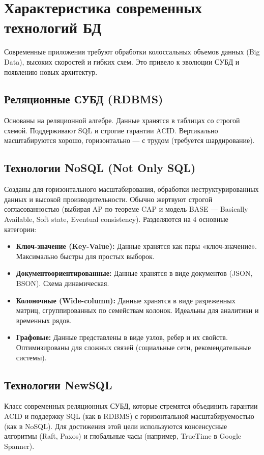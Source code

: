 \documentclass[12pt, a4paper]{article}
\begin{document}
\section{Характеристика современных технологий БД}

Современные приложения требуют обработки колоссальных объемов данных (Big Data), высоких скоростей и гибких схем. Это привело к эволюции СУБД и появлению новых архитектур.

\subsection{Реляционные СУБД (RDBMS)}
Основаны на реляционной алгебре. Данные хранятся в таблицах со строгой схемой. Поддерживают SQL и строгие гарантии ACID. Вертикально масштабируются хорошо, горизонтально — с трудом (требуется шардирование).

\subsection{Технологии NoSQL (Not Only SQL)}
Созданы для горизонтального масштабирования, обработки неструктурированных данных и высокой производительности. Обычно жертвуют строгой согласованностью (выбирая AP по теореме CAP и модель BASE — Basically Available, Soft state, Eventual consistency).
Разделяются на 4 основные категории:
\begin{itemize}
    \item \textbf{Ключ-значение (Key-Value):} Данные хранятся как пары «ключ-значение». Максимально быстры для простых выборок.
    \item \textbf{Документоориентированные:} Данные хранятся в виде документов (JSON, BSON). Схема динамическая.
    \item \textbf{Колоночные (Wide-column):} Данные хранятся в виде разреженных матриц, сгруппированных по семействам колонок. Идеальны для аналитики и временных рядов.
    \item \textbf{Графовые:} Данные представлены в виде узлов, ребер и их свойств. Оптимизированы для сложных связей (социальные сети, рекомендательные системы).
\end{itemize}

\subsection{Технологии NewSQL}
Класс современных реляционных СУБД, которые стремятся объединить гарантии ACID и поддержку SQL (как в RDBMS) с горизонтальной масштабируемостью (как в NoSQL). Для достижения этой цели используются консенсусные алгоритмы (Raft, Paxos) и глобальные часы (например, TrueTime в Google Spanner).
\end{document}
